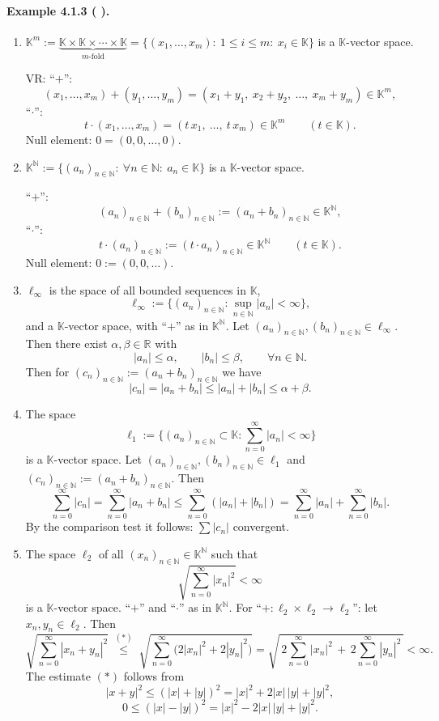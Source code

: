 \documentclass[12pt]{article}
\newcommand{\N}{\mathbb{N}}
\newcommand{\R}{\mathbb{R}}
\newcommand{\K}{\mathbb{K}} %
\newcommand{\NumberedExample}[3]{%
\paragraph*{Example #1 ( #2 ).} #3\par}
\begin{document}
\NumberedExample{4.1.3}{}{
\begin{enumerate}[label={(\arabic*)}, leftmargin=*]
	\item $\displaystyle \K^m := \underbrace{\K\times\K\times\cdots\times\K}_{m\text{-fold}} = \{(x_1,\dots,x_m):\ 1\le i\le m:\ x_i\in\K\}$ is a $\K$-vector space.

	VR: \quad “$+$”:
	\[
		(x_1,\dots,x_m) + (y_1,\dots,y_m) = (x_1+y_1,\ x_2+y_2,\ \dots,\ x_m+y_m) \in \K^m,
	\]
	“$\cdot$”:
	\[
		t\cdot(x_1,\dots,x_m) = (t\,x_1,\ \dots,\ t\,x_m) \in \K^m \qquad (t\in\K).
	\]
	Null element: $0=(0,0,\dots,0)$.

	\item $\displaystyle \K^{\N} := \{(a_n)_{n\in\N}:\ \forall n\in\N:\ a_n\in\K\}$ is a $\K$-vector space.

	“$+$”:
	\[
		(a_n)_{n\in\N} + (b_n)_{n\in\N} := (a_n+b_n)_{n\in\N} \in \K^{\N},
	\]
	“$\cdot$”:
	\[
		t\cdot(a_n)_{n\in\N} := (t\cdot a_n)_{n\in\N} \in \K^{\N} \qquad (t\in\K).
	\]
	Null element: $0 := (0,0,\dots)$.

	\item $\ell_\infty$ is the space of all bounded sequences in $\K$,
	\[
		\ell_\infty := \{ (a_n)_{n\in\N} : \sup_{n\in\N} |a_n| < \infty \},
	\]
	and a $\K$-vector space, with “$+$” as in $\K^{\N}$. Let $(a_n)_{n\in\N}, (b_n)_{n\in\N}\in \ell_\infty$. Then there exist $\alpha,\beta\in\R$ with
	\[
		|a_n| \le \alpha,\qquad |b_n| \le \beta, \qquad \forall n\in\N.
	\]
	Then for $(c_n)_{n\in\N} := (a_n+b_n)_{n\in\N}$ we have
	\[
		|c_n| = |a_n+b_n| \le |a_n| + |b_n| \le \alpha + \beta.
	\]

	\item The space
	\[
		\ell_1 := \{ (a_n)_{n\in\N} \subset \K : \sum_{n=0}^{\infty} |a_n| < \infty \}
	\]
	is a $\K$-vector space. Let $(a_n)_{n\in\N}, (b_n)_{n\in\N}\in \ell_1$ and $(c_n)_{n\in\N} := (a_n+b_n)_{n\in\N}$. Then
	\[
		\sum_{n=0}^{\infty} |c_n| = \sum_{n=0}^{\infty} |a_n+b_n| \le \sum_{n=0}^{\infty} (|a_n|+|b_n|) = \sum_{n=0}^{\infty} |a_n| + \sum_{n=0}^{\infty} |b_n|.
	\]
	By the comparison test it follows: $\sum |c_n|$ convergent.

	\item The space $\ell_2$ of all $(x_n)_{n\in\N}\in \K^{\N}$ such that
	\[
		\sqrt{\sum_{n=0}^{\infty} |x_n|^2} < \infty
	\]
	is a $\K$-vector space. “$+$” and “$\cdot$” as in $\K^{\N}$. For “$+\colon \ell_2\times\ell_2\to\ell_2$”: let $x_n, y_n\in \ell_2$. Then
	\[
		\sqrt{\sum_{n=0}^{\infty} |x_n+y_n|^2}
		\;\overset{(*)}{\le}\;
		\sqrt{\sum_{n=0}^{\infty} \big(2|x_n|^2 + 2|y_n|^2\big)}
		= \sqrt{\,2\sum_{n=0}^{\infty} |x_n|^2\, + \,2\sum_{n=0}^{\infty} |y_n|^2\,} 
		< \infty.
	\]
	The estimate $(*)$ follows from
	\[
		|x+y|^2 \le (|x|+|y|)^2 = |x|^2 + 2|x|\,|y| + |y|^2,
	\]
	\[
		0 \le (|x|-|y|)^2 = |x|^2 - 2|x|\,|y| + |y|^2.
	\]
\end{enumerate}}
\end{document}
